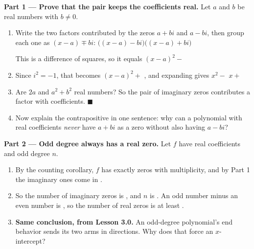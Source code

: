 \documentclass[10pt]{article}
\begin{document}
\begin{tcolorbox}[colback=white, colframe=black!40, title=\textbf{Tier E --- Extension},
    fonttitle=\bfseries, arc=1.5mm, left=3mm, right=3mm, top=2mm, bottom=2mm, breakable]
\textbf{Part 1 --- Prove that the pair keeps the coefficients real.} Let $a$ and $b$ be real numbers
with $b \ne 0$.
\begin{enumerate}[label=(\alph*), leftmargin=1.8em, itemsep=6pt]
  \item Write the two factors contributed by the zeros $a+bi$ and $a-bi$, then group each one as
        $(x-a) \mp bi$: \; $\big((x-a) - bi\big)\big((x-a) + bi\big)$

        \vspace{2pt}
        This is a difference of squares, so it equals $(x-a)^2 - $ \blank{1.6cm}
  \item Since $i^2 = -1$, that becomes $(x-a)^2 + $ \blank{1.2cm}, and expanding gives
        $x^2 - $ \blank{1.4cm} $x + $ \blank{2.4cm}
  \item Are $2a$ and $a^2+b^2$ real numbers? \blank{1.2cm} \; So the pair of imaginary zeros
        contributes a factor with \blank{2.4cm} coefficients. \; $\blacksquare$
  \item Now explain the contrapositive in one sentence: why can a polynomial with real coefficients
        \emph{never} have $a+bi$ as a zero without also having $a-bi$? \writeline
\end{enumerate}

\vspace{5pt}
\textbf{Part 2 --- Odd degree always has a real zero.} Let $f$ have real coefficients and odd degree
$n$.
\begin{enumerate}[label=(\alph*), leftmargin=1.8em, itemsep=6pt]
  \item By the counting corollary, $f$ has exactly \blank{1.0cm} zeros with multiplicity, and by
        Part 1 the imaginary ones come in \blank{1.4cm}.
  \item So the number of imaginary zeros is \blank{1.4cm}, and $n$ is \blank{1.4cm}. An odd number
        minus an even number is \blank{1.4cm}, so the number of real zeros is at least
        \blank{1.0cm}.
  \item \textbf{Same conclusion, from Lesson 3.0.} An odd-degree polynomial's end behavior sends its
        two arms in \blank{2.4cm} directions. Why does that force an $x$-intercept? \writeline
\end{enumerate}


\end{tcolorbox}
\end{document}
